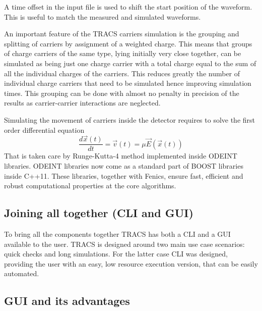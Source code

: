 A time offset in the input file is used to shift the start position of the waveform. This is useful to match the measured and simulated waveforms.


An important feature of the TRACS carriers simulation is the grouping and splitting of carriers by assignment of a weighted charge. This means that groups of charge carriers  of the same type, lying initially very close together, can be simulated as being just one charge carrier with a total charge equal to the sum of all the individual charges of the carriers. This reduces greatly the number of individual charge carriers that need to be simulated hence improving simulation times. This grouping can be done with almost no penalty in precision of the results as carrier-carrier interactions are neglected.

Simulating the movement of carriers inside the detector requires to solve the first order differential equation\cite{PdeCastro}\[\frac{d\vec{x}(t)}{dt} = \vec{v}(t) = \mu \vec{E}(\vec{x}(t))\]That is taken care by Runge-Kutta-4 method implemented inside ODEINT libraries. ODEINT libraries now come as a standard part of BOOST libraries inside C++11. These libraries, together with Fenics, ensure fast, efficient and robust computational properties at the core algorithms.



\subsection{Joining all together (CLI and GUI)}

To bring all the components together TRACS has both a CLI and a GUI available to the user. TRACS is designed around two main use case scenarios: quick checks and long simulations. For the latter case CLI was designed, providing the user with an easy, low resource execution version, that can be easily automated. 

\subsection{GUI and its advantages}

